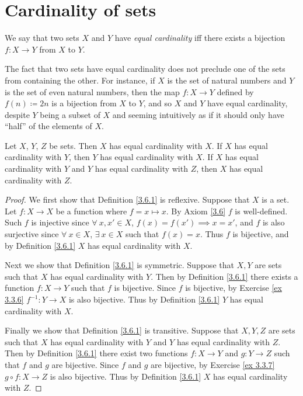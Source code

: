 \section{Cardinality of sets}\label{sec 3.6}

\begin{definition}\label{3.6.1}
    We say that two sets \(X\) and \(Y\) have \emph{equal cardinality} iff there exists a bijection \(f : X \to Y\) from \(X\) to \(Y\).
\end{definition}

\setcounter{theorem}{2}
\begin{remark}\label{3.6.3}
    The fact that two sets have equal cardinality does not preclude one of the sets from containing the other.
    For instance, if \(X\) is the set of natural numbers and \(Y\) is the set of even natural numbers, then the map \(f : X \to Y\) defined by \(f(n) \coloneqq 2n\) is a bijection from \(X\) to \(Y\), and so \(X\) and \(Y\) have equal cardinality, despite \(Y\) being a subset of \(X\) and seeming intuitively as if it should only have ``half'' of the elements of \(X\).
\end{remark}

\begin{proposition}\label{3.6.4}
    Let \(X\), \(Y\), \(Z\) be sets.
    Then \(X\) has equal cardinality with \(X\).
    If \(X\) has equal cardinality with \(Y\), then \(Y\) has equal cardinality with \(X\).
    If \(X\) has equal cardinality with \(Y\) and \(Y\) has equal cardinality with \(Z\), then \(X\) has equal cardinality with \(Z\).
\end{proposition}

\begin{proof}
    We first show that Definition \ref{3.6.1} is reflexive.
    Suppose that \(X\) is a set.
    Let \(f : X \to X\) be a function where \(f = x \mapsto x\).
    By Axiom \ref{3.6} \(f\) is well-defined.
    Such \(f\) is injective since \(\forall\ x, x' \in X\), \(f(x) = f(x') \implies x = x'\), and \(f\) is also surjective since \(\forall\ x \in X\), \(\exists\ x \in X\) such that \(f(x) = x\).
    Thus \(f\) is bijective, and by Definition \ref{3.6.1} \(X\) has equal cardinality with \(X\).

    Next we show that Definition \ref{3.6.1} is symmetric.
    Suppose that \(X, Y\) are sets such that \(X\) has equal cardinality with \(Y\).
    Then by Definition \ref{3.6.1} there exists a function \(f : X \to Y\) such that \(f\) is bijective.
    Since \(f\) is bijective, by Exercise \ref{ex 3.3.6} \(f^{-1} : Y \to X\) is also bijective.
    Thus by Definition \ref{3.6.1} \(Y\) has equal cardinality with \(X\).

    Finally we show that Definition \ref{3.6.1} is transitive.
    Suppose that \(X, Y, Z\) are sets such that \(X\) has equal cardinality with \(Y\) and \(Y\) has equal cardinality with \(Z\).
    Then by Definition \ref{3.6.1} there exist two functions \(f : X \to Y\) and \(g : Y \to Z\) such that \(f\) and \(g\) are bijective.
    Since \(f\) and \(g\) are bijective, by Exercise \ref{ex 3.3.7} \(g \circ f : X \to Z\) is also bijective.
    Thus by Definition \ref{3.6.1} \(X\) has equal cardinality with \(Z\).
\end{proof}

